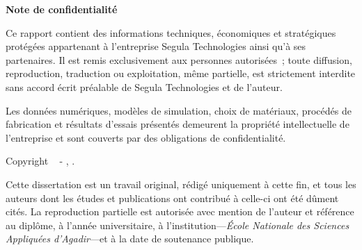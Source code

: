
\vspace*{\fill}

\begin{center}
    {\Large\bfseries\textcolor{ensablue}{Note de confidentialité}}
\end{center}

\vspace{2em}

Ce rapport contient des informations techniques, économiques et stratégiques protégées appartenant à l'entreprise Segula Technologies ainsi qu'à ses partenaires. Il est remis exclusivement aux personnes autorisées~; toute diffusion, reproduction, traduction ou exploitation, même partielle, est strictement interdite sans accord écrit préalable de Segula Technologies et de l'auteur.

\vspace{1em}

Les données numériques, modèles de simulation, choix de matériaux, procédés de fabrication et résultats d'essais présentés demeurent la propriété intellectuelle de l'entreprise et sont couverts par des obligations de confidentialité.

\vspace{2em}

\noindent{}

\vspace*{\fill}

\clearpage

\vspace*{\fill}

\noindent \textbf{\GetTitle}

\noindent Copyright \textcopyright~\the\year{} - \GetFirstAuthor, \GetSchool.

\vspace{.575em}

\noindent Cette dissertation est un travail original, rédigé uniquement à cette fin, et tous les auteurs dont les études et publications ont contribué à celle-ci ont été dûment cités. La reproduction partielle est autorisée avec mention de l'auteur et référence au diplôme, à l'année universitaire, à l'institution---\textit{École Nationale des Sciences Appliquées d'Agadir}---et à la date de soutenance publique.

\vspace{1.395em}

\noindent{}

\vspace*{\fill}
\MediaOptionLogic